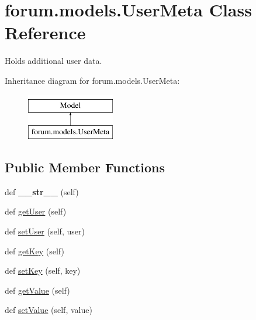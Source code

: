 \hypertarget{classforum_1_1models_1_1_user_meta}{}\section{forum.\+models.\+User\+Meta Class Reference}
\label{classforum_1_1models_1_1_user_meta}


Holds additional user data.  


Inheritance diagram for forum.\+models.\+User\+Meta\+:\begin{figure}[H]
\begin{center}
\leavevmode
\includegraphics[height=2.000000cm]{classforum_1_1models_1_1_user_meta}
\end{center}
\end{figure}
\subsection*{Public Member Functions}
\begin{DoxyCompactItemize}
\item 
\mbox{\label{classforum_1_1models_1_1_user_meta_ae7257459c1679cb2201a3090b2fe7118}} 
def {\bfseries \+\_\+\+\_\+str\+\_\+\+\_\+} (self)
\item 
def \mbox{\hyperlink{classforum_1_1models_1_1_user_meta_ac395c1b7f03bf5060dcb3681c0b7e698}{get\+User}} (self)
\item 
def \mbox{\hyperlink{classforum_1_1models_1_1_user_meta_af76d5d062dbb663171bfd16ffbe5448f}{set\+User}} (self, user)
\item 
def \mbox{\hyperlink{classforum_1_1models_1_1_user_meta_af5ee69e5ad0d80a8b4bb1df7dd44c212}{get\+Key}} (self)
\item 
def \mbox{\hyperlink{classforum_1_1models_1_1_user_meta_a8ef75719439f8dc2ef994a5070a3d913}{set\+Key}} (self, key)
\item 
def \mbox{\hyperlink{classforum_1_1models_1_1_user_meta_a7ecc4d5bfadd1c1889a00097d295178d}{get\+Value}} (self)
\item 
def \mbox{\hyperlink{classforum_1_1models_1_1_user_meta_ac953dbb8410b74c20dfc3b217b5f9373}{set\+Value}} (self, value)
\end{DoxyCompactItemize}
